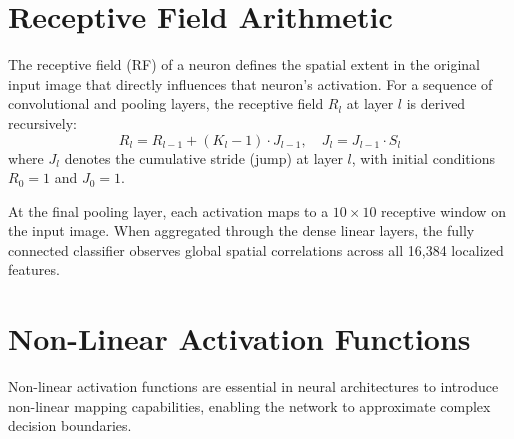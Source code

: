 \documentclass[11pt,a4paper,oneside]{report}
\begin{document}
\section{Receptive Field Arithmetic}
The receptive field (RF) of a neuron defines the spatial extent in the original input image that directly influences that neuron's activation. For a sequence of convolutional and pooling layers, the receptive field $R_l$ at layer $l$ is derived recursively:
\begin{equation}
    R_l = R_{l-1} + (K_l - 1) \cdot J_{l-1}, \quad J_l = J_{l-1} \cdot S_l
\end{equation}
where $J_l$ denotes the cumulative stride (jump) at layer $l$, with initial conditions $R_0 = 1$ and $J_0 = 1$.

\begin{table}[H]
\centering
\caption{Receptive Field Progression Across Network Hierarchy.}
\label{tab:receptive_field}
\end{table}

At the final pooling layer, each activation maps to a $10 \times 10$ receptive window on the input image. When aggregated through the dense linear layers, the fully connected classifier observes global spatial correlations across all 16,384 localized features.

\section{Non-Linear Activation Functions}
Non-linear activation functions are essential in neural architectures to introduce non-linear mapping capabilities, enabling the network to approximate complex decision boundaries.
\end{document}
